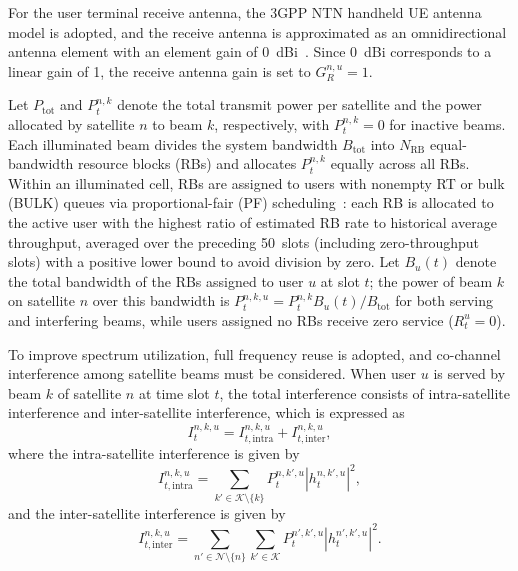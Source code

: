\documentclass[journal]{IEEEtran}
\begin{document}
For the user terminal receive antenna, the 3GPP NTN handheld UE antenna model is adopted, and the receive antenna is approximated as an omnidirectional antenna element with an element gain of 0~dBi~\cite{ref29}. Since 0~dBi corresponds to a linear gain of 1, the receive antenna gain is set to $G_R^{n,u}=1$.

Let $P_{\mathrm{tot}}$ and $P_t^{n,k}$ denote the total transmit power per satellite and the power allocated by satellite $n$ to beam $k$, respectively, with $P_t^{n,k}=0$ for inactive beams. Each illuminated beam divides the system bandwidth $B_{\mathrm{tot}}$ into $N_{\mathrm{RB}}$ equal-bandwidth resource blocks (RBs) and allocates $P_t^{n,k}$ equally across all RBs. Within an illuminated cell, RBs are assigned to users with nonempty RT or bulk (BULK) queues via proportional-fair (PF) scheduling~\cite{refPFclassic,refPFrb}: each RB is allocated to the active user with the highest ratio of estimated RB rate to historical average throughput, averaged over the preceding 50~slots (including zero-throughput slots) with a positive lower bound to avoid division by zero. Let $B_u(t)$ denote the total bandwidth of the RBs assigned to user $u$ at slot $t$; the power of beam $k$ on satellite $n$ over this bandwidth is $P_t^{n,k,u}=P_t^{n,k}B_u(t)/B_{\mathrm{tot}}$ for both serving and interfering beams, while users assigned no RBs receive zero service ($R_t^u=0$).


To improve spectrum utilization, full frequency reuse is adopted, and co-channel interference among satellite beams must be considered. When user $u$ is served by beam $k$ of satellite $n$ at time slot $t$, the total interference consists of intra-satellite interference and inter-satellite interference, which is expressed as
\begin{equation}
I_t^{n,k,u}=I_{t,\mathrm{intra}}^{n,k,u}+I_{t,\mathrm{inter}}^{n,k,u},
\end{equation}
where the intra-satellite interference is given by
\begin{equation}
I_{t,\mathrm{intra}}^{n,k,u}
=
\sum_{k'\in\mathcal{K}\setminus\{k\}}
{P}_t^{n,k',u}
|h_t^{n,k',u}|^2,
\end{equation}
and the inter-satellite interference is given by
\begin{equation}
I_{t,\mathrm{inter}}^{n,k,u}
=
\sum_{n'\in\mathcal{N}\setminus\{n\}}
\sum_{k'\in\mathcal{K}}
{P}_t^{n',k',u}
|h_t^{n',k',u}|^2.
\label{eq:inter-satellite-interference}
\end{equation}
\end{document}
